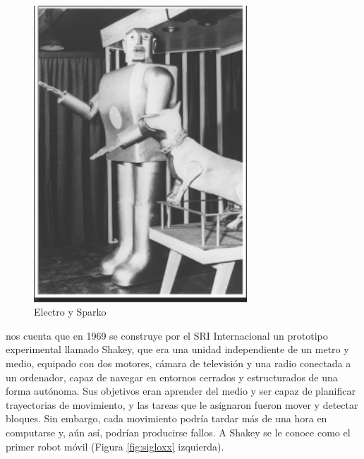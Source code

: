 \begin{figure} [h!]
	\begin{center}
		\includegraphics[width=8cm]{figs/electro-sparko.png}
	\end{center}
	\caption{Electro y Sparko} %
	\label{fig:EyS}
\end{figure}



\cite{nilsson1984shakey} nos cuenta que en 1969 se construye por el \ac{SRI} Internacional un prototipo experimental llamado Shakey, que era una unidad independiente de un metro y medio, equipado con dos motores, cámara de televisión y una radio conectada a un ordenador, capaz de navegar en entornos cerrados y estructurados de una forma autónoma. Sus objetivos eran aprender del medio y ser capaz de planificar trayectorias de movimiento, y las tareas que le asignaron fueron mover y detectar bloques. Sin embargo, cada movimiento podría tardar más de una hora en computarse y, aún así, podrían producirse fallos. A Shakey se le conoce como el primer robot móvil (Figura \ref{fig:sigloxx} izquierda). \\

